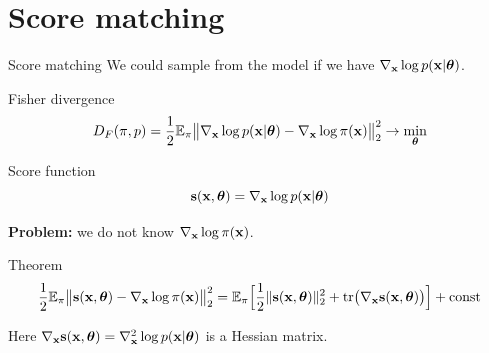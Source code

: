 \section{Score matching}
\begin{frame}{Score matching}
	We could sample from the model if we have $\nabla_{\mathbf{x}}\log p(\mathbf{x}| \boldsymbol{\theta})$.
	\begin{block}{Fisher divergence}
		\vspace{-0.3cm}
		\[
			D_F(\pi, p) = \frac{1}{2}\mathbb{E}_{\pi}\bigl\| \nabla_{\mathbf{x}}\log p(\mathbf{x}| \boldsymbol{\theta}) - \nabla_{\mathbf{x}} \log \pi(\mathbf{x}) \bigr\|^2_2 \rightarrow \min_{\boldsymbol{\theta}}
		\]
		\vspace{-0.5cm}
	\end{block}
	\begin{block}{Score function}
		\vspace{-0.3cm}
		\[
			\mathbf{s}(\mathbf{x}, \boldsymbol{\theta}) = \nabla_{\mathbf{x}}\log p(\mathbf{x}| \boldsymbol{\theta})
		\]
	\end{block}
	\textbf{Problem:} we do not know $\nabla_{\mathbf{x}} \log \pi(\mathbf{x})$.
	\begin{block}{Theorem}
		\vspace{-0.6cm}
		\[
			\frac{1}{2} \mathbb{E}_{\pi}\bigl\| \mathbf{s}(\mathbf{x}, \boldsymbol{\theta}) - \nabla_{\mathbf{x}} \log \pi(\mathbf{x}) \bigr\|^2_2 = \mathbb{E}_{\pi}\Bigr[ \frac{1}{2}\| \mathbf{s}(\mathbf{x}, \boldsymbol{\theta}) \|_2^2 + \text{tr}\bigl(\nabla_{\mathbf{x}} \mathbf{s}(\mathbf{x}, \boldsymbol{\theta})\bigr) \Bigr] + \text{const}
		\]
		\vspace{-0.4cm}
	\end{block}
	Here $\nabla_{\mathbf{x}} \mathbf{s}(\mathbf{x}, \boldsymbol{\theta}) = \nabla_{\mathbf{x}}^2 \log p(\mathbf{x} | \boldsymbol{\theta})$ is a Hessian matrix.
\end{frame}
